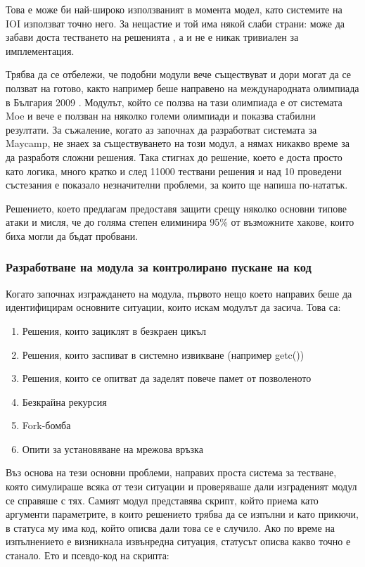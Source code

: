 \documentclass[a4paper,12pt]{article}
\begin{document}
  Това е може би най-широко използваният в момента модел, като системите на IOI използват точно него. За нещастие и той има някой слаби страни: може да забави доста тестването на решенията \cite{performance_reactive_tasks}, а и не е никак тривиален за имплементация.
  
  Трябва да се отбележи, че подобни модули вече съществуват и дори могат да се ползват на готово, както например беше направено на международната олимпиада в България 2009 \cite{validating_security}. Модулът, който се ползва на тази олимпиада е от системата Moe и вече е ползван на няколко големи олимпиади и показва стабилни резултати. За съжаление, когато аз започнах да разработват системата за Maycamp, не знаех за съществуването на този модул, а нямах никакво време за да разработя сложни решения. Така стигнах до решение, което е доста просто като логика, много кратко и след 11000 тествани решения и над 10 проведени състезания е показало незначителни проблеми, за които ще напиша по-нататък.
  
  Решението, което предлагам предоставя защити срещу няколко основни типове атаки и мисля, че до голяма степен елиминира 95\% от възможните хакове, които биха могли да бъдат пробвани.
  
  \subsubsection{Разработване на модула за контролирано пускане на код}
  Когато започнах изграждането на модула, първото нещо което направих беше да идентифицирам основните ситуации, които искам модулът да засича. Това са:
  
  \begin{enumerate}
    \item Решения, които зациклят в безкраен цикъл
    \item Решения, които заспиват в системно извикване (например getc())
    \item Решения, които се опитват да заделят повече памет от позволеното
    \item Безкрайна рекурсия
    \item Fork-бомба
    \item Опити за установяване на мрежова връзка
  \end{enumerate}
  
  Въз основа на тези основни проблеми, направих проста система за тестване, която симулираше всяка от тези ситуации и проверяваше дали изграденият модул се справяше с тях. Самият модул представява скрипт, който приема като аргументи параметрите, в които решението трябва да се изпълни и като прикючи, в статуса му има код, който описва дали това се е случило. Ако по време на изпълнението е визникнала извънредна ситуация, статусът описва какво точно е станало. Ето и псевдо-код на скрипта:
  
\end{document}
